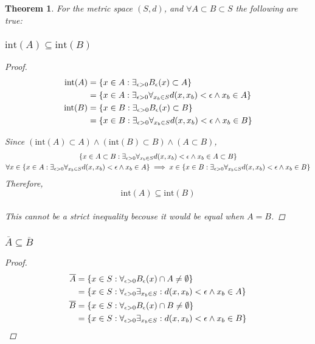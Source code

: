 \documentclass[]{article}
\newtheorem{theorem}{Theorem}
\begin{document}
\begin{theorem}
    For the metric space $(S,d)$, and $\forall A \subset B \subset S$ the following are true: 
    \subsubsection{$\text{int}(A) \subseteq \text{int}(B)$}
    \begin{proof}
        \begin{align*}
            \text{int}(A) &= \qty{x \in A : \exists_{\epsilon>0} B_\epsilon(x) \subset A}\\
            &= \qty{x \in A : 
                \exists_{\epsilon>0} \forall_{x_b \in S} d(x,x_b)<\epsilon 
                \land x_b \in A}\\
            \text{int}(B) &= \qty{x \in B : \exists_{\epsilon>0} B_\epsilon(x) \subset B}\\
            &= \qty{x \in B : 
                \exists_{\epsilon>0} \forall_{x_b \in S} d(x,x_b)<\epsilon 
                \land x_b \in B}\\
        \end{align*}
        
        Since $(\text{int}(A) \subset A) \land (\text{int}(B) \subset B) \land (A \subset B)$,
        \begin{gather*}
            \qty{x \in A\subset B : 
                \exists_{\epsilon>0} \forall_{x_b \in S} d(x,x_b)<\epsilon 
                \land x_b \in A \subset B}\\
            \forall x \in \qty{x \in A : 
                \exists_{\epsilon>0} \forall_{x_b \in S} d(x,x_b)<\epsilon 
                    \land x_b \in A} 
                \implies x \in \qty{x \in B : 
                    \exists_{\epsilon>0} \forall_{x_b \in S} d(x,x_b)<\epsilon 
                        \land x_b \in B}
        \end{gather*}
        Therefore,
        $$\text{int}(A) \subseteq \text{int}(B)$$\\
        This cannot be a strict inequality becouse it would be equal when $A = B$.
    \end{proof}
    \subsubsection{$\overline{A} \subseteq \overline{B}$}
    \begin{proof}
        \begin{align*}
            \overline{A} &= \qty{x \in S : 
                \forall_{\epsilon> 0} B_\epsilon(x) \cap A \neq \emptyset}\\
            &= \qty{x \in S : 
                \forall_{\epsilon> 0} \exists_{x_b \in S} : d(x,x_b) < \epsilon 
                \land x_b \in A}\\
            \overline{B} &= \qty{x \in S : 
                \forall_{\epsilon> 0} B_\epsilon(x) \cap B \neq \emptyset}\\
            &= \qty{x \in S : 
                \forall_{\epsilon> 0} \exists_{x_b \in S} : d(x,x_b) < \epsilon 
                \land x_b \in B}\\
        \end{align*}


\end{proof}
\end{theorem}
\end{document}
